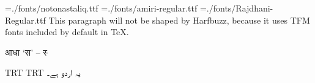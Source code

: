 
\pagewidth=210mm
\pageheight=297mm
\hsize=210mm
\hsize=190mm
\hoffset=10mm
\nopagenumbers
\parindent=0mm
\font\noto={./fonts/notonastaliq.ttf}
\font\amiri={./fonts/amiri-regular.ttf}
\font\raj={./fonts/Rajdhani-Regular.ttf}
This paragraph will not be shaped by Harfbuzz, because it uses TFM fonts included by default in \TeX.

\raj
आधा ‘स’ – स्‍

\textdir TRT
\pardir TRT
\noto
یہ اردو ہے۔
\bye

